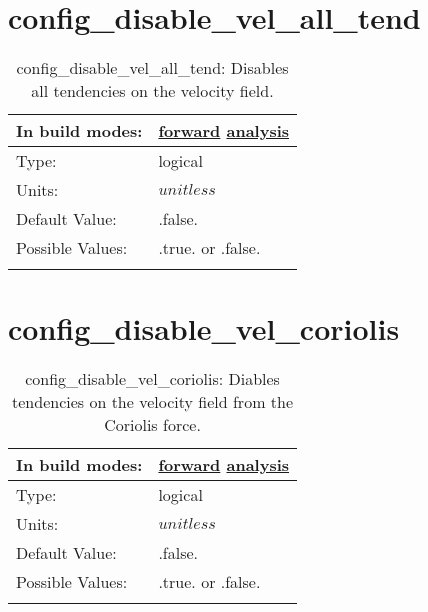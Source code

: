 \section[config\_disable\_vel\_all\_tend]{config\_disable\_vel\_all\_tend}
\label{sec:nm_sec_config_disable_vel_all_tend}
\begin{center}
\begin{longtable}{| p{2.0in} || p{4.0in} |}
    \hline
    In build modes: & \hyperref[subsec:forward_nm_tab_debug]{forward} \hyperref[subsec:analysis_nm_tab_debug]{analysis} \\
    \hline
    Type: & logical \\
    \hline
    Units: & $unitless$ \\
    \hline
    Default Value: & .false. \\
    \hline
    Possible Values: & .true. or .false. \\
    \hline
    \caption{config\_disable\_vel\_all\_tend: Disables all tendencies on the velocity field.}
\end{longtable}
\end{center}
\section[config\_disable\_vel\_coriolis]{config\_disable\_vel\_coriolis}
\label{sec:nm_sec_config_disable_vel_coriolis}
\begin{center}
\begin{longtable}{| p{2.0in} || p{4.0in} |}
    \hline
    In build modes: & \hyperref[subsec:forward_nm_tab_debug]{forward} \hyperref[subsec:analysis_nm_tab_debug]{analysis} \\
    \hline
    Type: & logical \\
    \hline
    Units: & $unitless$ \\
    \hline
    Default Value: & .false. \\
    \hline
    Possible Values: & .true. or .false. \\
    \hline
    \caption{config\_disable\_vel\_coriolis: Diables tendencies on the velocity field from the Coriolis force.}
\end{longtable}
\end{center}
